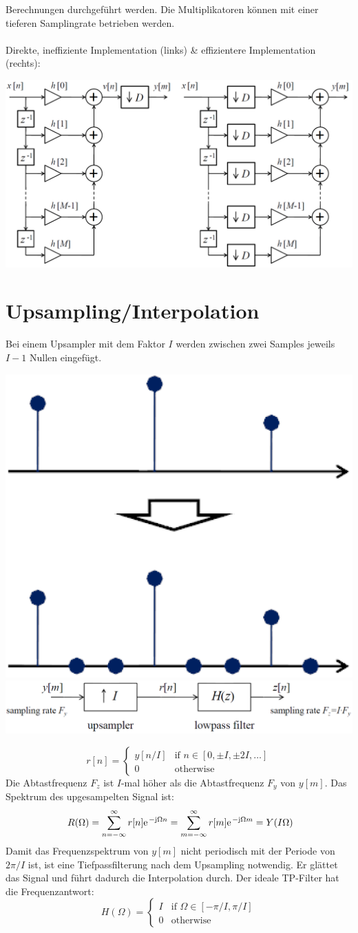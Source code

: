 Berechnungen durchgeführt werden. Die Multiplikatoren können mit einer 
tieferen Samplingrate betrieben werden. \\\\
Direkte, ineffiziente Implementation (links) \& effizientere Implementation (rechts):
\begin{center}
	\includegraphics[width=.7\textwidth]{../fig/decimation_scheme}
\end{center}

\section{Upsampling/Interpolation}
Bei einem Upsampler mit dem Faktor $I$ werden zwischen zwei Samples jeweils
$I-1$ Nullen eingefügt.
\begin{center}
	\includegraphics[width=.2\textwidth]{../fig/upsample}
	\includegraphics[width=.6\textwidth]{../fig/interpolation}
\end{center}
\[ r[n] = \left\lbrace \begin{matrix}
	y[n/I] & \textrm{if } n \in [0,\pm I, \pm 2I,\ldots]\\
	0 & \textrm{otherwise}
\end{matrix} \right. \] 
Die Abtastfrequenz $F_z$ ist $I$-mal höher als die Abtastfrequenz $F_y$ von
$y[m]$. Das Spektrum des upgesampelten Signal ist:
\[ \ R(\Omega) = \sum_{n=-\infty}^{\infty} r[n]
	\e^{-\im\Omega n} 
	= \sum_{m=-\infty}^{\infty} r[m]\e^{-\im\Omega m}
	= Y(I\Omega)  \]
Damit das Frequenzspektrum von $y[m]$ nicht periodisch mit der Periode
von $2\pi/I$ ist, ist eine Tiefpassfilterung nach dem Upsampling notwendig. 
Er glättet das Signal und führt dadurch die Interpolation durch. Der
ideale TP-Filter hat die Frequenzantwort:
\[ H(\Omega) = \left\lbrace \begin{matrix}
	I & \textrm{if } \Omega \in [-\pi/I,\pi/I]\\
	0 & \textrm{otherwise}
	\end{matrix} \right. \]


